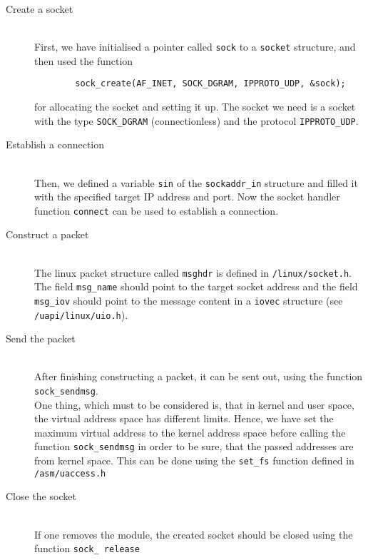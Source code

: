 \begin{description}
	\item[Create a socket]\hfill \\
	First, we have initialised a pointer called \texttt{sock} to a \texttt{socket} structure, and then used the function
\begin{center}
\lstset{escapechar=,style=customc}
	\begin{lstlisting}
		sock_create(AF_INET, SOCK_DGRAM, IPPROTO_UDP, &sock);
	\end{lstlisting}
\end{center}
for allocating the socket and setting it up. The socket we need is a socket with the type \texttt{SOCK\_DGRAM} (connectionless) and the protocol \texttt{IPPROTO\_UDP}.
  \item[Establish a connection] \hfill\\
	Then, we defined a variable \texttt{sin} of the \texttt{sockaddr\_in} structure and filled it with the specified target IP address and port. Now the socket handler function \texttt{connect} can be used to establish a connection.
	\item[Construct a packet] \hfill \\
The linux packet structure called \texttt{msghdr} is defined in \verb+/linux/socket.h+. The field \texttt{msg\_name} should point to the target socket address and the field \texttt{msg\_iov} should point to the message content in a \texttt{iovec} structure (see \verb+/uapi/linux/uio.h+). 
	\item[Send the packet] \hfill \\
	After finishing constructing a packet, it can be sent out, using the function \texttt{sock\_sendmsg}. \\
	One thing, which must to be considered is, that in kernel and user space, the virtual address space has different limits. Hence, we have set the maximum virtual address to the kernel address space before calling the function \texttt{sock\_sendmsg} in order to be sure, that the passed addresses are from kernel space. This can be done using the \texttt{set\_fs} function defined in \verb+/asm/uaccess.h+
	\item[Close the socket] \hfill \\
	If one removes the module, the created socket should be closed using the function \texttt{sock\_ release}
\end{description}
